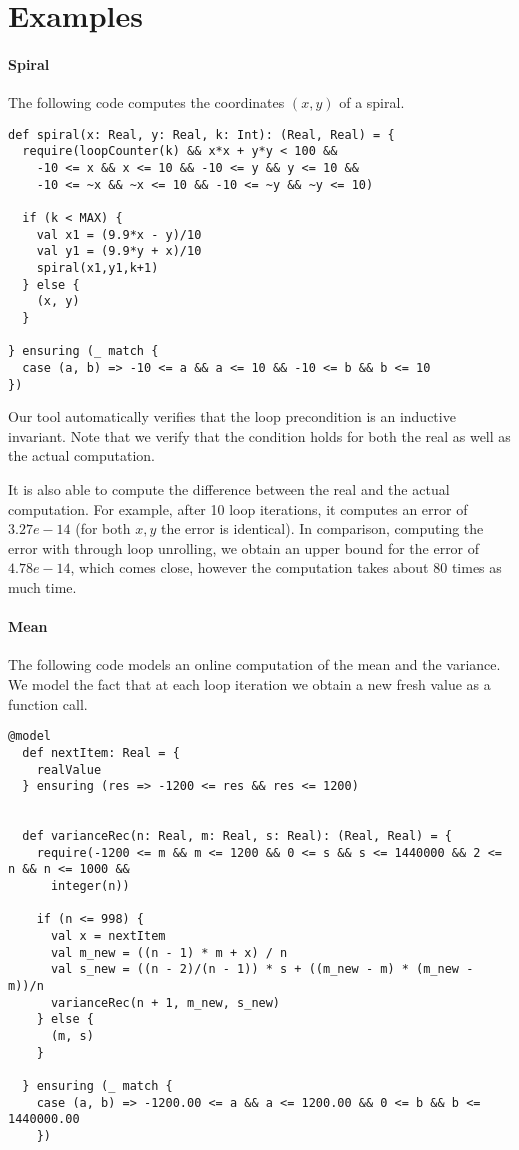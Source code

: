 \section{Examples}

\paragraph{Spiral}
The following code computes the coordinates $(x, y)$ of a spiral.
\begin{lstlisting}
def spiral(x: Real, y: Real, k: Int): (Real, Real) = {
  require(loopCounter(k) && x*x + y*y < 100 &&
    -10 <= x && x <= 10 && -10 <= y && y <= 10 &&
    -10 <= ~x && ~x <= 10 && -10 <= ~y && ~y <= 10)

  if (k < MAX) {
    val x1 = (9.9*x - y)/10
    val y1 = (9.9*y + x)/10
    spiral(x1,y1,k+1)
  } else {
    (x, y)
  }

} ensuring (_ match {
  case (a, b) => -10 <= a && a <= 10 && -10 <= b && b <= 10
})
\end{lstlisting}

Our tool automatically verifies that the loop precondition is an inductive
invariant. Note that we verify that the condition holds for both the real
as well as the actual computation.

It is also able to compute the difference between the real and the
actual computation. For example, after 10 loop iterations, it computes an
error of $3.27e-14$ (for both $x, y$ the error is identical). In comparison,
computing the error with through loop unrolling, we obtain an upper bound for
the error of $4.78e-14$, which comes close, however the computation takes
about 80 times as much time.


\paragraph{Mean}

The following code models an online computation of the mean and the variance.
We model the fact that at each loop iteration we obtain a new fresh value
as a function call.

\begin{lstlisting}
@model
  def nextItem: Real = {
    realValue
  } ensuring (res => -1200 <= res && res <= 1200)


  def varianceRec(n: Real, m: Real, s: Real): (Real, Real) = {
    require(-1200 <= m && m <= 1200 && 0 <= s && s <= 1440000 && 2 <= n && n <= 1000 &&
      integer(n))

    if (n <= 998) {
      val x = nextItem
      val m_new = ((n - 1) * m + x) / n
      val s_new = ((n - 2)/(n - 1)) * s + ((m_new - m) * (m_new - m))/n
      varianceRec(n + 1, m_new, s_new)
    } else {
      (m, s)
    }

  } ensuring (_ match {
    case (a, b) => -1200.00 <= a && a <= 1200.00 && 0 <= b && b <= 1440000.00
    })
\end{lstlisting}




